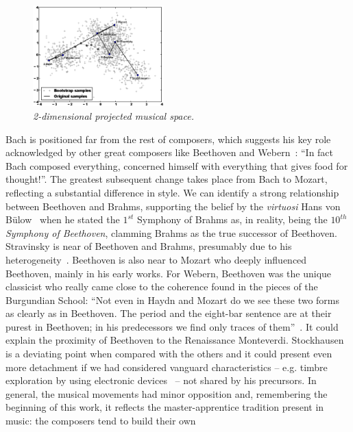 \documentclass[
 aip,
 jmp,
 amsmath,amssymb,
 reprint,
]{revtex4-1}
\begin{document}
\begin{figure}[htbp]
  \begin{center}
    \includegraphics[width=0.45\textwidth]{g1}
  \end{center}
  \caption{\it 2-dimensional projected musical space.}
  \label{fig:pca}
\end{figure}

Bach is positioned far from the rest of
composers, which suggests his key role
acknowledged by other great composers like Beethoven and
Webern~\cite{Webern}: ``In fact Bach composed everything, concerned
himself with everything that gives food for thought!''. 
The greatest subsequent change takes place from Bach to Mozart,
reflecting a substantial difference in style.
We can identify a strong relationship between
Beethoven and Brahms, supporting the belief by the \textit{virtuosi} Hans von B\"{u}low~\cite{Bulow} when he
stated the $1^{st}$ Symphony of Brahms as, in reality, being the \textit{$10^{th}$ Symphony of
Beethoven}, clamming Brahms as the true successor of
Beethoven. Stravinsky is near of Beethoven and Brahms,
presumably due to his heterogeneity~\cite{BennettHistory,
  Lovelock}. Beethoven is also near to Mozart who deeply influenced
Beethoven, mainly in his early works.
For Webern, Beethoven was the unique classicist who really came close
to the coherence found in the pieces of the Burgundian School: ``Not even
in Haydn and Mozart do we see these two forms as clearly as in
Beethoven. The period and the eight-bar sentence are at their purest
in Beethoven; in his predecessors we find only traces of them''~\cite{Webern}. It
could explain the proximity of Beethoven to the Renaissance  Monteverdi.
Stockhausen is a deviating point when compared with the others and it
could present even more detachment if we had considered
vanguard characteristics -- e.g. timbre exploration by using
electronic devices~\cite{Lovelock} -- not
shared by his precursors.
In general, the musical movements had minor opposition and,
remembering the beginning of this work, it reflects the
master-apprentice
tradition present in music: the composers tend to build their own
\end{document}
